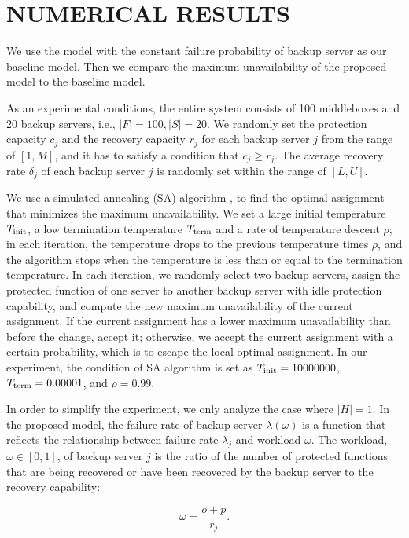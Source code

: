 \documentclass[conference]{IEEEtran}
\begin{document}
\section{NUMERICAL RESULTS}
We use the model with the constant failure probability of backup server as our baseline model. Then we compare the maximum unavailability of the proposed model to the baseline model.

As an experimental conditions, the entire system consists of 100 middleboxes and 20 backup servers, i.e., $|F|=100, |S|=20$. We randomly set the protection capacity $c_j$ and the recovery capacity $r_j$ for each backup server $j$ from the range of $[1, M]$, and it has to satisfy a condition that $c_j \ge r_j$. The average recovery rate $\delta_j$ of each backup server $j$ is randomly set within the range of $[L,U]$.

We use a simulated-annealing (SA) algorithm \cite{aarts1988simulated}, \cite{dowsland2012simulated} to find the optimal assignment that minimizes the maximum unavailability. We set a large initial temperature $T_{\rm init}$, a low termination temperature $T_{\rm term}$ and a rate of temperature descent $\rho$; in each iteration, the temperature drops to the previous temperature times $\rho$, and the algorithm stops when the temperature is less than or equal to the termination temperature. In each iteration, we randomly select two backup servers, assign the protected function of one server to another backup server with idle protection capability, and compute the new maximum unavailability of the current assignment. If the current assignment has a lower maximum unavailability than before the change, accept it; otherwise, we accept the current assignment with a certain probability, which is to escape the local optimal assignment. In our experiment, the condition of SA algorithm is set as $T_{\rm init}=10000000$, $T_{\rm term}=0.00001$, and $\rho=0.99$.

In order to simplify the experiment, we only analyze the case where $|H|=1$. In the proposed model, the failure rate of backup server $\lambda(\omega)$ is a function that reflects the relationship between failure rate $\lambda_j$ and workload $\omega$. The workload, $\omega \in [0,1]$, of backup server $j$ is the ratio of the number of protected functions that are being recovered or have been recovered by the backup server to the recovery capability:

\begin{equation}
    \omega=\frac{o+p}{r_j}.
\end{equation}
\end{document}
